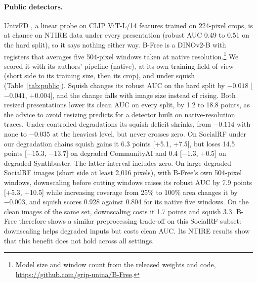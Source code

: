 \documentclass[letterpaper]{article} %
\begin{document}
\paragraph{Public detectors.} UnivFD \cite{ojha2023univfd}, a linear probe on
CLIP ViT-L/14 features trained on 224-pixel crops, is at chance on NTIRE data
under every presentation (robust AUC 0.49 to 0.51 on the hard split), so it
says nothing either way. B-Free \cite{guillaro2025bfree} is a DINOv2-B with
registers that averages five 504-pixel windows taken at native
resolution.\footnote{Model size and window count from the released weights
and code, \url{https://github.com/grip-unina/B-Free}.} We scored it with its
authors' pipeline (native), at its own training field of view (short side to
its training size, then its crop), and under squish (Table~\ref{tab:public}).
Squish changes its robust AUC on the hard split by $-0.018$ [$-0.041$,
+0.004], and the change falls with image size instead of rising. Both resized
presentations lower its clean AUC on every split, by 1.2 to 18.8 points, as
the advice to avoid resizing predicts for a detector built on
native-resolution traces. Under controlled degradations its squish deficit
shrinks, from $-0.114$ with none to $-0.035$ at the heaviest level, but never
crosses zero. On SocialRF under our degradation chains squish gains it 6.3
points [+5.1, +7.5], but loses 14.5 points [$-15.3$, $-13.7$] on degraded CommunityAI and 0.4 [$-1.3$, +0.5] on degraded Synthbuster. The latter interval includes zero. On large degraded SocialRF images (short side at least 2,016
pixels), with B-Free's own 504-pixel windows, downscaling before cutting
windows raises its robust AUC by 7.9 points [+5.3, +10.5] while increasing coverage from 25\% to 100\% area changes it by $-0.003$, and squish scores 0.928 against 0.804 for its native
five windows. On the clean images of the same set, downscaling costs it 1.7
points and squish 3.3. B-Free therefore shows a similar preprocessing trade-off on this SocialRF
subset: downscaling helps degraded inputs but costs clean AUC. Its NTIRE
results show that this benefit does not hold across all settings.
\end{document}
